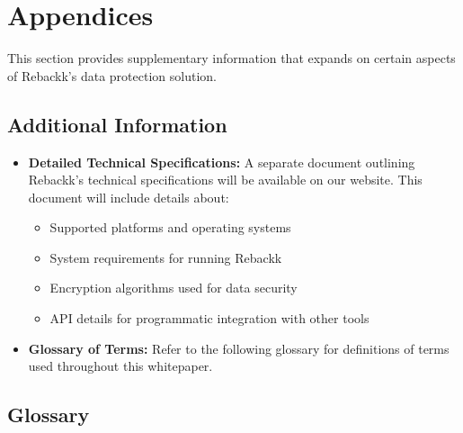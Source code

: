 \documentclass[12pt]{article}
\begin{document}
\section*{Appendices}

This section provides supplementary information that expands on certain aspects of Rebackk's data protection solution.

\subsection*{Additional Information}

\begin{itemize}
    \item \textbf{Detailed Technical Specifications:} A separate document outlining Rebackk's technical specifications will be available on our website. This document will include details about:
    \begin{itemize}
        \item Supported platforms and operating systems
        \item System requirements for running Rebackk
        \item Encryption algorithms used for data security
        \item API details for programmatic integration with other tools
    \end{itemize}
    \item \textbf{Glossary of Terms:} Refer to the following glossary for definitions of terms used throughout this whitepaper.
\end{itemize}

\subsection*{Glossary}
\end{document}
